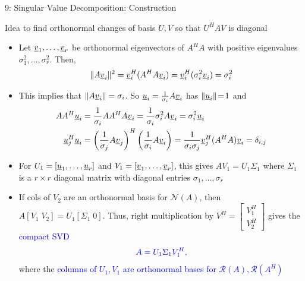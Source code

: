 \documentclass[10pt,english,aspectratio=169]{beamer}
\begin{document}
\begin{frame}[shrink=5]{9: Singular Value Decomposition: Construction}

Idea to find orthonormal changes of basis $U,V$ so that $U^H A V$ is diagonal

\begin{itemize}
\setlength\itemsep{3mm}

\item<1-> Let $\underline{v}_1, \ldots, \underline{v}_r$ be orthonormal eigenvectors of $A^H A$ with positive eigenvalues $\sigma_1^2,\ldots,\sigma_r^2$.
Then, \[\|A \underline{v}_i\| ^2 = \underline{v}_i^H (A^H A \underline{v}_i) =  \underline{v}_i^H (\sigma_i^2\underline{v}_i) = \sigma_i^2 \]

\item<2-> This implies that $\|A \underline{v}_i\| = \sigma_i$.
So $\underline{u}_i = \frac{1}{\sigma_i} A\underline{v}_i$ has $\| \underline{u}_i \| \!=\! 1$ and \vspace{-1mm}
\begin{align*}
A A^H \vecnot{u}_i &= \frac{1}{\sigma_i} A A^H A \vecnot{v}_i = \frac{1}{\sigma_i} \sigma_i^2 A \vecnot{v}_i = \sigma_i^2 \vecnot{u}_i
\\
\vecnot{u}_j^H \vecnot{u}_i &= \left(\frac{1}{\sigma_j} A \vecnot{v}_j \right)^H \left(\frac{1}{\sigma_i} A \vecnot{v}_i \right) =\frac{1}{\sigma_i \sigma_j} \vecnot{v}_j^H (A^H A) \vecnot{v}_i = \delta_{i,j}  \vspace{-1mm}
\end{align*}


\item<3-> For $U_1 = [\underline{u}_1,\ldots,\underline{u}_r]
$ and $V_1 = [\underline{v}_1,\ldots,\underline{v}_r]$, this gives $A V_1 = U_1 \Sigma_1$ where $\Sigma_1$ is a $r \times r$ diagonal matrix with diagonal entries $\sigma_1,\ldots,\sigma_r\!\!\!\!$

\item<4-> If cols of $V_2$ are an orthonormal basis for $\mathcal{N}(A)$,
then $A[V_1 \; V_2]=U_1 [\Sigma_1 \; 0]$.
Thus, right multiplication by $V^H = \begin{bmatrix} V_1^H \\ V_2^H \end{bmatrix}$ gives the \textcolor{blue}{compact SVD} \vspace{-0.5mm} \[ \color{blue} A = U_1 \Sigma_1 V_1^H, \vspace{-1.5mm}\]
where the \textcolor{blue}{columns of $U_1, V_1$ are orthonormal bases for $\mathcal{R}(A), \mathcal{R}(A^H)$}

\end{itemize}


\end{frame}
\end{document}
